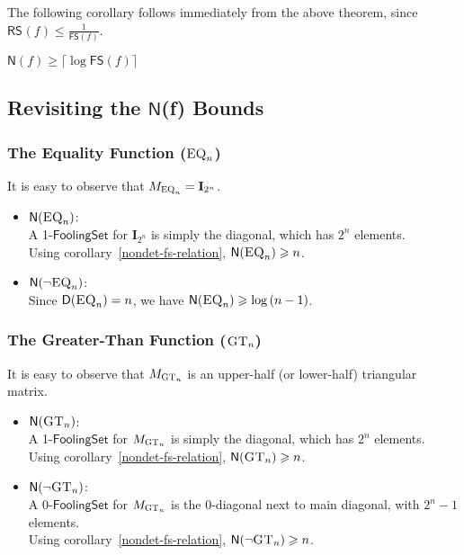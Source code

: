 \documentclass[usletter]{article}
\newcommand {\mat}[1]  {\ensuremath{\mathbf{#1}}}
\newcommand {\complexity}[1] {\ensuremath{\mathsf{#1}}}
\newcommand {\D}             {\complexity{D}}
\newcommand {\N}             {\complexity{N}}
\newcommand {\FS}            {\complexity{FS}}
\newcommand {\RS}[1]         {\ensuremath{\complexity{RS}_{#1}}}
\newcommand {\function}[2]  {\ensuremath{\textsc{#1}_{#2}}}
\begin{document}
\noindent
The following corollary follows immediately from the above theorem, since $\displaystyle \RS{}(f) \leqslant \frac{1}{\FS{}(f)}$.

\begin{corollary}$\label{nondet-fs-relation}
\displaystyle
\N(f) \geqslant \bigg\lceil \log{\FS(f)} \bigg\rceil
$\end{corollary}




\subsection*{Revisiting the \N(f) Bounds}

\subsubsection*{The Equality Function (\function{EQ}{n})}

It is easy to observe that $M_{\function{EQ}{n}} = \mat{I}_{2^n}$.

\begin{itemize}
  \item $\N(\function{EQ}{n})$: \\
  A 1-\complexity{FoolingSet} for $\mat{I}_{2^n}$ is simply the diagonal, which has $2^n$ elements. \\
  Using corollary~\ref{nondet-fs-relation}, $\N(\function{EQ}{n}) \geqslant n$.

  \item $\N(\neg\function{EQ}{n})$: \\
  Since $\D(\function{EQ}{n}) = n$, we have $\N(\function{EQ}{n}) \geqslant \log{(n-1)}$.
\end{itemize}


\subsubsection*{The Greater-Than Function (\function{GT}{n})}

It is easy to observe that $M_{\function{GT}{n}}$ is an upper-half (or lower-half) triangular matrix.

\begin{itemize}
  \item $\N(\function{GT}{n})$: \\
  A 1-\complexity{FoolingSet} for $M_{\function{GT}{n}}$ is simply the diagonal, which has $2^n$ elements. \\
  Using corollary~\ref{nondet-fs-relation}, $\N(\function{GT}{n}) \geqslant n$.

  \item $\N(\neg\function{GT}{n})$: \\
  A 0-\complexity{FoolingSet} for $M_{\function{GT}{n}}$ is the 0-diagonal next to main diagonal, with $2^n-1$ elements. \\
  Using corollary~\ref{nondet-fs-relation}, $\N(\neg\function{GT}{n}) \geqslant n$.
\end{itemize}
\end{document}
